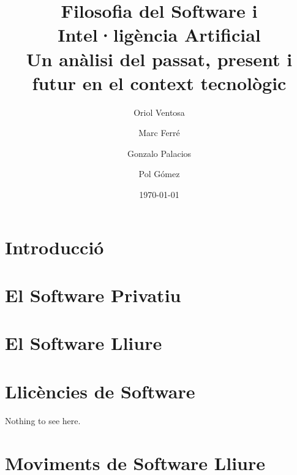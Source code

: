 \documentclass[a4paper,12pt]{report}
\begin{document}
\title{
	{\bf Filosofia del Software i Intel·ligència Artificial} \\ \vspace{2 mm}
	{\large Un anàlisi del passat, present i futur en el context tecnològic}
}
\author{
	Oriol Ventosa \and
	Marc Ferré \and
	Gonzalo Palacios \and
	Pol Gómez
}
\date{\today}
\maketitle

\tableofcontents

\chapter{Introducció}


\chapter{El Software Privatiu}


\chapter{El Software Lliure}


\chapter{Llicències de Software}
Nothing to see here.

\chapter{Moviments de Software Lliure}

\end{document}
